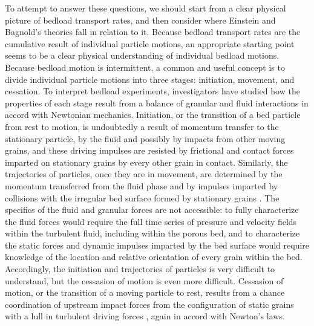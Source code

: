 \documentclass{article}
\begin{document}
{%


To attempt to answer these questions, we should start from a clear physical picture of bedload transport rates, and then consider where Einstein and Bagnold's theories fall in relation to it. 
Because bedload transport rates are the cumulative result of individual particle motions, an appropriate starting point seems to be a clear physical understanding of individual bedload motions. 
Because bedload motion is intermittent, a common and useful concept is to divide individual particle motions into three stages: initiation, movement, and cessation. 
To interpret bedload experiments, investigators have studied how the properties of each stage result from a balance of granular and fluid interactions in accord with Newtonian mechanics. 
Initiation, or the transition of a bed particle from rest to motion, is undoubtedly a result of momentum transfer to the stationary particle, by the fluid and possibly by impacts from other moving grains, and these driving impulses are resisted by frictional and contact forces imparted on stationary grains by every other grain in contact. 
Similarly, the trajectories of particles, once they are in movement, are determined by the momentum transferred from the fluid phase and by impulses imparted by collisions with the irregular bed surface formed by stationary grains \citep{Wiberg1985, Bialik2015}. 
The specifics of the fluid and granular forces are not accessible: to fully characterize the fluid forces would require the full time series of pressure and velocity fields within the turbulent fluid, including within the porous bed, and to characterize the static forces and dynamic impulses imparted by the bed surface would require knowledge of the location and relative orientation of every grain within the bed. 
Accordingly, the initiation and trajectories of particles is very difficult to understand, but the cessasion of motion is even more difficult. 
Cessasion of motion, or the transition of a moving particle to rest, results from a chance coordination of upstream impact forces from the configuration of static grains with a lull in turbulent driving forces \citep{Pahtz2018}, again in accord with Newton's laws.  









}
\end{document}
